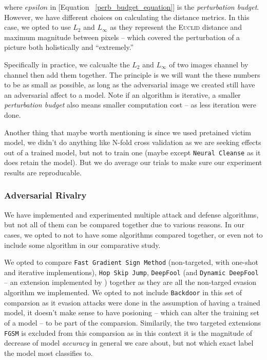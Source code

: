 \documentclass[11pt]{article}
\newcommand{\ilc}{\texttt}
\begin{document}
	where $epsilon$ in [Equation \ \ref{perb_budget_equation}] is the \textit{perturbation budget}. However, we have different choices on calculating the distance metrics. In this case, we opted to use $L_2$ and $L_{\infty}$ as they represent the \textsc{Euclid} distance and maximum magnitude between pixels -- which covered the perturbation of a picture both holistically and ``extremely.''
	
	Specifically in practice, we calcualte the $L_2$ and $L_{\infty}$ of two images channel by channel then add them together. The principle is we will want the these numbers to be as small as possible, as long as the adversarial image we created still have an adversarial affect to a model. Note if an algorithm is iterative, a smaller \textit{perturbation budget} also means smaller computation cost -- as less iteration were done.\newline
	
	\noindent Another thing that maybe worth mentioning is since we used pretained victim model, we didn't do anything like N-fold cross validation as we are seeking effects out of a trained model, but not to train one (maybe except \ilc{Neural Cleanse} as it does retain the model). But we do average our trials to make sure our experiment results are reproducable.
	
	
	\subsubsection{Adversarial Rivalry}
	
	We have implemented and experimented multiple attack and defense algorithms, but not all of them can be compared together due to various reasons. In our cases, we opted to not to have some algorithms compared together, or even not to include some algorithm in our comparative study.
	
	We opted to compare \ilc{Fast Gradient Sign Method} (non-targeted, with one-shot and iterative implementions), \ilc{Hop Skip Jump}, \ilc{DeepFool} (and \ilc{Dynamic DeepFool} -- an extension implemented by ) together as they are all the non-targed evasion algorithm we implemented. We opted to not include \ilc{Backdoor} in this set of comparsion as it evasion attacks were done in the assumption of having a trained model, it doesn't make sense to have posioning -- which can alter the training set of a model -- to be part of the comparsion. Similarily, the two targeted extensions \ilc{FGSM} is excluded from this comparsion as in this context it is the magnitude of decrease of model \textit{accuracy} in general we care about, but not which exact label the model most classifies to.
	
\end{document}
